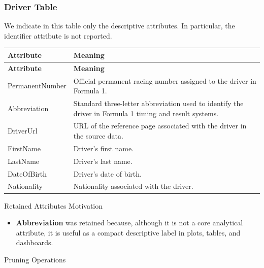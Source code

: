\documentclass[a4paper,11pt]{article}
\begin{document}
	\subsubsection{Driver Table}
	
	We indicate in this table only the descriptive attributes. In particular, the identifier attribute is not reported.
	
	\begin{longtable}{|p{4cm}|p{10.8cm}|}
		\hline
		\textbf{Attribute} & \textbf{Meaning} \\
		\hline
		\endfirsthead
		
		\hline
		\textbf{Attribute} & \textbf{Meaning} \\
		\hline
		\endhead
		
		PermanentNumber & Official permanent racing number assigned to the driver in Formula 1. \\ \hline
		
		Abbreviation & Standard three-letter abbreviation used to identify the driver in Formula 1 timing and result systems. \\ \hline
		
		DriverUrl & URL of the reference page associated with the driver in the source data. \\ \hline
		
		FirstName & Driver's first name. \\ \hline
		
		LastName & Driver's last name. \\ \hline
		
		DateOfBirth & Driver's date of birth. \\ \hline
		
		Nationality & Nationality associated with the driver. \\ \hline
		
	\end{longtable}
	
	Retained Attributes Motivation
	
	\begin{itemize}
		\item \textbf{Abbreviation} was retained because, although it is not a core analytical attribute, it is useful as a compact descriptive label in plots, tables, and dashboards.
	\end{itemize}
	
	Pruning Operations
	
\end{document}
